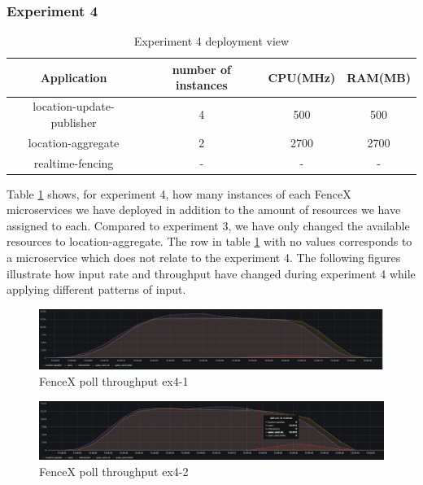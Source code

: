 \documentclass[a4]{report}
\begin{document}
    \clearpage

    \subsubsection{Experiment 4}
    \begin{table}[h!]
        \centering
        \begin{tabular}{|c|c|c|c|}
            \hline
            Application               & number of instances & CPU(MHz) & RAM(MB) \\
            \hline
            location-update-publisher & 4                   & 500      & 500     \\
            location-aggregate        & 2                   & 2700     & 2700    \\
            realtime-fencing          & -                   & -        & -       \\
            \hline
        \end{tabular}
        \caption{Experiment 4 deployment view}
        \label{table:ex4-dv}
    \end{table}

    Table \ref{table:ex4-dv} shows, for experiment 4, how many instances of each FenceX microservices we have
    deployed in addition to the amount of resources we have assigned to each.
    Compared to experiment 3, we have only changed the available resources to location-aggregate.
    The row in table \ref{table:ex4-dv} with no values corresponds to a microservice which does not relate to the
    experiment 4.
    The following figures illustrate how input rate and throughput have changed during experiment 4 while applying
    different patterns of input.

    \begin{figure}[h!]
        \centering
        \caption{FenceX poll throughput ex4-1}
        \label{fig:ex4-1}
        \includegraphics[width=\linewidth, scale=2]{images/evaluation/ex4-benchmarking(19,10).png}
    \end{figure}

    \begin{figure}[h!]
        \centering
        \caption{FenceX poll throughput ex4-2}
        \label{fig:ex4-2}
        \includegraphics[width=\linewidth, scale=2]{images/evaluation/ex4-benchmarking(22,10).png}
    \end{figure}
\end{document}
